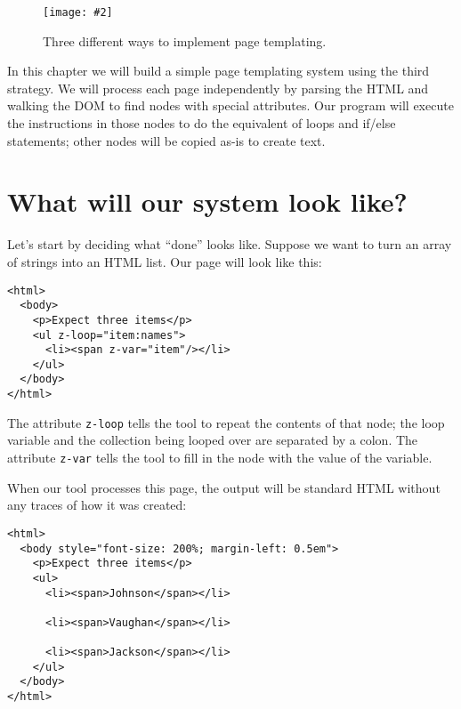 \documentclass[krantzl]{krantz}
\newcommand{\figpdf}[4]{\begin{figure}%
\centering%
\texttt{[image: \#2]}%
\caption{#3}%
\label{#1}%
\end{figure}}
\begin{document}
\figpdf{page-templates-options}{./page-templates/options.pdf}{Three different ways to implement page templating.}{0.6}


\noindent In this chapter we will build a simple page templating system using the third strategy.
We will process each page independently by parsing the HTML
and walking the DOM to find nodes with special attributes.
Our program will execute the instructions in those nodes
to do the equivalent of loops and if/else statements;
other nodes will be copied as-is to create text.

\section{What will our system look like?}\label{page-templates-syntax}


Let’s start by deciding what “done” looks like.
Suppose we want to turn an array of strings into an HTML list.
Our page will look like this:


\begin{lstlisting}[frame=tblr,backgroundcolor=\color{black!5}]
<html>
  <body>
    <p>Expect three items</p>
    <ul z-loop="item:names">
      <li><span z-var="item"/></li>
    </ul>
  </body>
</html>
\end{lstlisting}



\noindent The attribute \texttt{z-loop} tells the tool to repeat the contents of that node;
the loop variable and the collection being looped over are separated by a colon.
The attribute \texttt{z-var} tells the tool to fill in the node with the value of the variable.


When our tool processes this page,
the output will be standard HTML without any traces of how it was created:


\begin{lstlisting}[frame=tblr,backgroundcolor=\color{black!5}]
<html>
  <body style="font-size: 200%; margin-left: 0.5em">
    <p>Expect three items</p>
    <ul>
      <li><span>Johnson</span></li>

      <li><span>Vaughan</span></li>

      <li><span>Jackson</span></li>
    </ul>
  </body>
</html>
\end{lstlisting}
\end{document}
